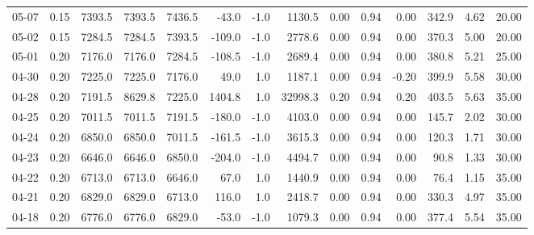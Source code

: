 \begin{threeparttable}
{\begin{tabular}{lrrrrrrrrrrrrr}
  05-07 &     0.15 & 7393.5 & 7393.5 & 7436.5 &      -43.0 &                     -1.0 &              1130.5 &       0.00 &      0.94 &           0.00 &            342.9 &            4.62 &                  20.00 \\
  05-02 &     0.15 & 7284.5 & 7284.5 & 7393.5 &     -109.0 &                     -1.0 &              2778.6 &       0.00 &      0.94 &           0.00 &            370.3 &            5.00 &                  20.00 \\
  05-01 &     0.20 & 7176.0 & 7176.0 & 7284.5 &     -108.5 &                     -1.0 &              2689.4 &       0.00 &      0.94 &           0.00 &            380.8 &            5.21 &                  25.00 \\
  04-30 &     0.20 & 7225.0 & 7225.0 & 7176.0 &       49.0 &                      1.0 &              1187.1 &       0.00 &      0.94 &          -0.20 &            399.9 &            5.58 &                  30.00 \\
  04-28 &     0.20 & 7191.5 & 8629.8 & 7225.0 &     1404.8 &                      1.0 &             32998.3 &       0.20 &      0.94 &           0.20 &            403.5 &            5.63 &                  35.00 \\
  04-25 &     0.20 & 7011.5 & 7011.5 & 7191.5 &     -180.0 &                     -1.0 &              4103.0 &       0.00 &      0.94 &           0.00 &            145.7 &            2.02 &                  30.00 \\
  04-24 &     0.20 & 6850.0 & 6850.0 & 7011.5 &     -161.5 &                     -1.0 &              3615.3 &       0.00 &      0.94 &           0.00 &            120.3 &            1.71 &                  30.00 \\
  04-23 &     0.20 & 6646.0 & 6646.0 & 6850.0 &     -204.0 &                     -1.0 &              4494.7 &       0.00 &      0.94 &           0.00 &             90.8 &            1.33 &                  30.00 \\
  04-22 &     0.20 & 6713.0 & 6713.0 & 6646.0 &       67.0 &                      1.0 &              1440.9 &       0.00 &      0.94 &           0.00 &             76.4 &            1.15 &                  35.00 \\
  04-21 &     0.20 & 6829.0 & 6829.0 & 6713.0 &      116.0 &                      1.0 &              2418.7 &       0.00 &      0.94 &           0.00 &            330.3 &            4.97 &                  35.00 \\
  04-18 &     0.20 & 6776.0 & 6776.0 & 6829.0 &      -53.0 &                     -1.0 &              1079.3 &       0.00 &      0.94 &           0.00 &            377.4 &            5.54 &                  35.00 \\

\end{tabular}}
\end{threeparttable}
